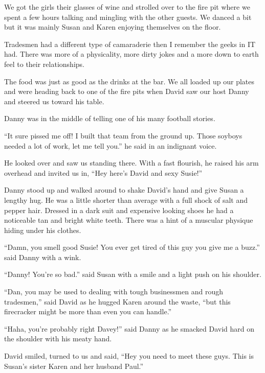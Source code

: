 We got the girls their glasses of wine and strolled over to the
fire pit where we spent a few hours talking and
mingling with the other guests. We danced a bit but it was
mainly Susan and Karen enjoying themselves on the floor.

Tradesmen had a different type of camaraderie then I
remember the geeks in IT had.  There was more of a physicality,
more dirty jokes and a more down to earth feel to their
relationships.

The food was just as good as the drinks at the bar.  We all
loaded up our plates and were heading back to one of the fire
pits when David saw our host Danny and steered us toward his
table.

Danny was in the middle of telling one of his many football
stories.

``It sure pissed me off! I built that team from the ground up.
Those soyboys needed a lot of work, let me tell you.'' he said
in an indignant voice.

He looked over and saw us standing there. With a fast flourish,
he raised his arm overhead and invited us in, ``Hey here's David
and sexy Susie!''

Danny stood up and walked around to shake David's hand and give
Susan a lengthy hug. He was a little shorter than average with a
full shock of salt and pepper hair. Dressed in a dark suit and
expensive looking shoes he had a noticeable tan and bright white
teeth. There was a hint of a muscular physique hiding under his
clothes.

``Damn, you smell good Susie! You ever get tired of this guy you
give me a buzz.'' said Danny with a wink.

``Danny!  You're so bad.'' said Susan with a smile and a light
push on his shoulder.

``Dan, you may be used to dealing with tough businessmen and
rough tradesmen,'' said David as he hugged Karen around the
waste, ``but this firecracker might be more than even you can
handle.''

``Haha, you're probably right Davey!'' said Danny as he smacked
David hard on the shoulder with his meaty hand.

David smiled, turned to us and said, ``Hey you need to meet
these guys. This is Susan's sister Karen and her husband Paul.''


